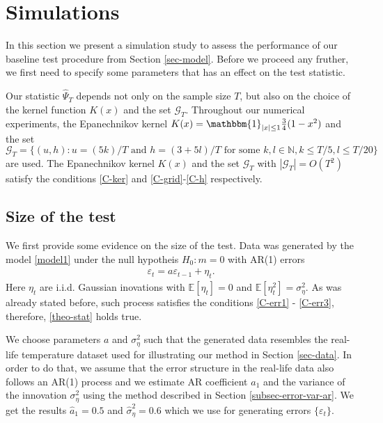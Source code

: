 
\section{Simulations}\label{sec-sim}
In this section we present a simulation study to assess the performance of our baseline test procedure from Section \ref{sec-model}. Before we proceed any fruther, we first need to specify some parameters that has an effect on the test statistic.

Our statistic $\widehat{\Psi}_T$ depends not only on the sample size $T$, but also on the choice of the kernel function $K(x)$ and the set $\mathcal{G}_T$. Throughout our numerical experiments, the Epanechnikov kernel $K(x) = \mathbbm{1}_{|x|\leq 1} \frac{3}{4} (1 - x^2)$ and the set $\mathcal{G}_T = \{(u, h): u = (5k)/T \text{ and } h = (3+5l)/T \text{ for some } k, l \in \mathbb{N}, k \le T/5, l \le T/20\}$ are used. The Epanechnikov kernel $K(x)$ and the set $\mathcal{G}_T$ with $|\mathcal{G}_T| = O(T^2)$ satisfy the conditions \ref{C-ker} and \ref{C-grid}-\ref{C-h} respectively.

\subsection{Size of the test}\label{subsec-sim-size}
We first provide some evidence on the size of the test. Data was generated by the model \ref{model1} under the null hypotheis $H_0: m=0$ with AR(1) errors
\begin{align*}
\varepsilon_t = a \varepsilon_{t-1} + \eta_t.
\end{align*}
Here $\eta_t$ are i.i.d. Gaussian inovations with $\mathbb{E}[\eta_t] = 0$ and $\mathbb{E}[\eta_t^2] = \sigma_{\eta}^2$. As was already stated before, such process satisfies the conditions \ref{C-err1} - \ref{C-err3}, therefore, \ref{theo-stat} holds true.

We choose parameters $a$ and $ \sigma_{\eta}^2$ such that the generated data resembles the real-life temperature dataset used for illustrating our method in Section \ref{sec-data}. In order to do that, we assume that the error structure in the real-life data also follows an AR(1) process and we estimate AR coefficient $a_1$ and the variance of the innovation $\sigma_{\eta}^2$ using the method described in Section \ref{subsec-error-var-ar}. We get the results $\hat{a}_1 = 0.5$ and $\hat{\sigma}_{\eta}^2 = 0.6$ which we use for generating errors $\{\varepsilon_t\}$.


